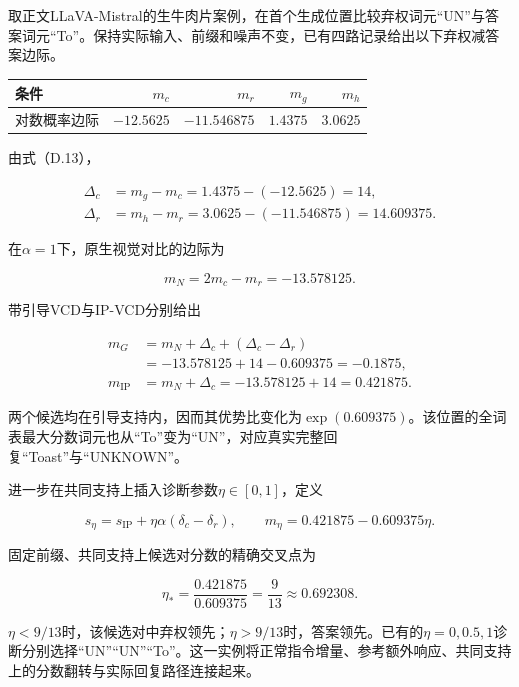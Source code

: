取正文LLaVA-Mistral的生牛肉片案例，在首个生成位置比较弃权词元``UN''与答案词元``To''。保持实际输入、前缀和噪声不变，已有四路记录给出以下弃权减答案边际。

\begin{longtable}[]{@{}lrrrr@{}}
\toprule\noalign{}
条件 & \(m_c\) & \(m_r\) & \(m_g\) & \(m_h\) \\
\midrule\noalign{}
\endhead
\bottomrule\noalign{}
\endlastfoot
对数概率边际 & \(-12.5625\) & \(-11.546875\) & \(1.4375\) & \(3.0625\) \\
\end{longtable}

由式（D.13），

\[
\begin{aligned}
\Delta_c&=m_g-m_c=1.4375-(-12.5625)=14,\\
\Delta_r&=m_h-m_r=3.0625-(-11.546875)=14.609375.
\end{aligned}
\tag{D.52}
\]

在\(\alpha=1\)下，原生视觉对比的边际为

\[
m_N=2m_c-m_r=-13.578125.
\tag{D.53}
\]

带引导VCD与IP-VCD分别给出

\[
\begin{aligned}
m_G&=m_N+\Delta_c+(\Delta_c-\Delta_r)\\
&=-13.578125+14-0.609375=-0.1875,\\
m_{\mathrm{IP}}&=m_N+\Delta_c=-13.578125+14=0.421875.
\end{aligned}
\tag{D.54}
\]

两个候选均在引导支持内，因而其优势比变化为\(\exp(0.609375)\)。该位置的全词表最大分数词元也从``To''变为``UN''，对应真实完整回复``Toast''与``UNKNOWN''。

进一步在共同支持上插入诊断参数\(\eta\in[0,1]\)，定义

\[
s_\eta=s_{\mathrm{IP}}+\eta\alpha(\delta_c-\delta_r),
\qquad
m_\eta=0.421875-0.609375\eta.
\tag{D.55}
\]

固定前缀、共同支持上候选对分数的精确交叉点为

\[
\eta_* = \frac{0.421875}{0.609375}=\frac9{13}\approx0.692308.
\tag{D.56}
\]

\(\eta<9/13\)时，该候选对中弃权领先；\(\eta>9/13\)时，答案领先。已有的\(\eta=0,0.5,1\)诊断分别选择``UN''``UN''``To''。这一实例将正常指令增量、参考额外响应、共同支持上的分数翻转与实际回复路径连接起来。

